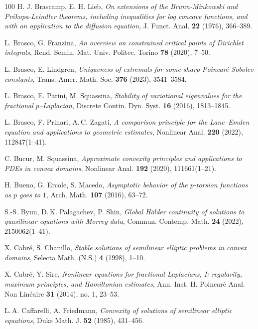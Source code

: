 \documentclass[11pt, reqno]{amsart}
\theoremstyle{definition}
\numberwithin{equation}{section}
\begin{document}
\begin{thebibliography}{100}
 H. J. Brascamp, E. H. Lieb,
\emph{On extensions of the Brunn-Minkowski and Prékopa-Leindler theorems, including inequalities for log concave functions, and with an application to the diffusion equation},
J. Funct. Anal. \textbf{22} (1976), %
366--389.

 L. Brasco, G. Franzina,
\emph{An overview on constrained critical points of Dirichlet integrals},
Rend. Semin. Mat. Univ. Politec. Torino \textbf{78} (2020), %
7--50. 

 L. Brasco, E. Lindgren,
\emph{Uniqueness of extremals for some sharp Poincaré-Sobolev constants},
Trans. Amer. Math. Soc. \textbf{376} (2023), %
3541--3584.

 L. Brasco, E. Parini, M. Squassina,
\emph{Stability of variational eigenvalues for the fractional $p$–Laplacian},
Discrete Contin. Dyn. Syst. \textbf{16} (2016), %
1813--1845. 

 L. Brasco, F. Prinari, A.$\,$C. Zagati,
\emph{A comparison principle for the Lane–Emden equation and applications to geometric estimates},
Nonlinear Anal. \textbf{220} (2022), %
112847(1--41).

 C. Bucur, M. Squassina,
\emph{Approximate convexity principles and applications to PDEs in convex domains},
Nonlinear Anal. \textbf{192} (2020), %
111661(1--21).

 H. Bueno, G. Ercole, S. Macedo,
\emph{Asymptotic behavior of the $p$-torsion functions as $p$ goes to $1$},
Arch. Math. \textbf{107} (2016), %
63--72.

 S.-S. Byun, D.$\,$K. Palagachev, P. Shin,
\emph{Global Hölder continuity of solutions to quasilinear equations with Morrey data},
Commun. Contemp. Math. \textbf{24} (2022), %
 2150062(1--41). 
 
 X. Cabré, S. Chanillo,
\emph{Stable solutions of semilinear elliptic problems in convex domains},
Selecta Math. (N.S.) \textbf{4} (1998), %
1--10.

 X. Cabré, Y. Sire, 
\emph{Nonlinear equations for fractional Laplacians, I: regularity, maximum principles, and Hamiltonian estimates},
Ann. Inst. H. Poincaré Anal. Non Linéaire \textbf{31} (2014), no. 1, 23--53.

 L.$\,$A. Caffarelli, A. Friedmann,
\emph{Convexity of solutions of semilinear elliptic equations},
Duke Math. J. \textbf{52} (1985), %
431--456.


\end{thebibliography}
\end{document}
